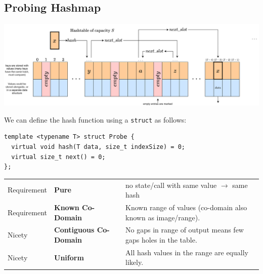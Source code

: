 \subsection{Probing Hashmap}
\begin{center}
    \includegraphics[width=.9\textwidth]{algorithms_and_indices/images/hash_table.drawio.png}
\end{center}
We can define the hash function using a \texttt{struct} as follows:
\begin{verbatim}
template <typename T> struct Probe {
  virtual void hash(T data, size_t indexSize) = 0;
  virtual size_t next() = 0;
};
\end{verbatim}
\begin{center}
    \begin{tabular}{l l p{}}
        Requirement & \textbf{Pure}                 & no state/call with same value $\to$ same hash                 \\
        Requirement & \textbf{Known Co-Domain}      & Known range of values (co-domain also known as image/range).  \\
        Nicety      & \textbf{Contiguous Co-Domain} & No gaps in range of output means few gaps holes in the table. \\
        Nicety      & \textbf{Uniform}              & All hash values in the range are equally likely.              \\
    \end{tabular}
\end{center}
